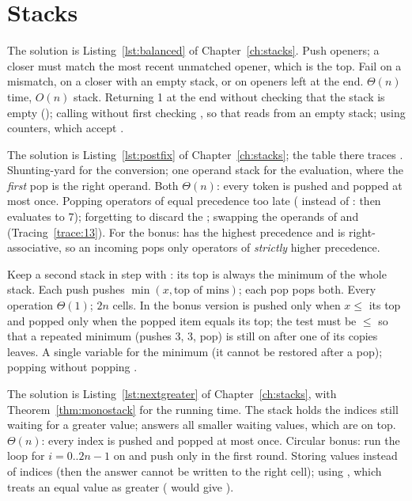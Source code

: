 \section{Stacks}

The solution is Listing~\ref{lst:balanced} of Chapter~\ref{ch:stacks}.
\idea Push openers; a closer must match the most recent unmatched opener, which is the
top. Fail on a mismatch, on a closer with an empty stack, or on openers left at the end.
\complexity $\Theta(n)$ time, $O(n)$ stack.
\mistakes Returning 1 at the end without checking that the stack is empty ();
calling  without first checking , so that  reads from an
empty stack; using counters, which accept .

The solution is Listing~\ref{lst:postfix} of Chapter~\ref{ch:stacks}; the table there
traces .
\idea Shunting-yard for the conversion; one operand stack for the evaluation, where the
\emph{first} pop is the right operand.
\complexity Both $\Theta(n)$: every token is pushed and popped at most once.
\mistakes Popping operators of equal precedence too late (\cc{>} instead of \cc{>=}: then
 evaluates to 7); forgetting to discard the \cc{(}; swapping the operands of
\cc{-} and \cc{/} (Tracing~\ref{trace:13}). For the bonus: \cc{\^} has the highest
precedence and is right-associative, so an incoming \cc{\^} pops only operators of
\emph{strictly} higher precedence.

\idea Keep a second stack  in step with : its top is always the minimum
of the whole stack. Each push pushes $\min(x,\text{top of mins})$; each pop pops both.
\complexity Every operation $\Theta(1)$; $2n$ cells. In the bonus version  is
pushed only when $x\le$ its top and popped only when the popped item equals its top; the
test must be $\le$ so that a repeated minimum (pushes 3, 3, pop) is still on 
after one of its copies leaves.
\mistakes A single variable for the minimum (it cannot be restored after a pop); popping
 without popping .

The solution is Listing~\ref{lst:nextgreater} of Chapter~\ref{ch:stacks}, with
Theorem~\ref{thm:monostack} for the running time.
\idea The stack holds the indices still waiting for a greater value;  answers
all smaller waiting values, which are on top.
\complexity $\Theta(n)$: every index is pushed and popped at most once. Circular bonus:
run the loop for $i=0..2n-1$ on  and push only in the first round.
\mistakes Storing values instead of indices (then the answer cannot be written to the
right cell); using \cc{<=}, which treats an equal value as greater (\cc{[1,1]} would give
\cc{[1,-1]}).

